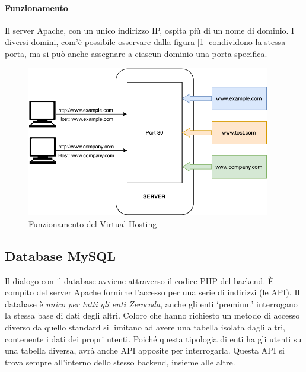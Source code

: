 \paragraph{Funzionamento} Il server Apache, con un unico indirizzo IP, ospita più di un nome di dominio. I diversi domini, com'è  possibile osservare dalla figura [\ref{fig:virtualhosting}] condividono la stessa porta, ma si può anche assegnare a ciascun dominio una porta specifica.

\begin{figure}[H]
    \centering
    \includegraphics[width=0.95\textwidth]{images/02_4_virtual_hosting.pdf}
    \caption{Funzionamento del Virtual Hosting}
    \label{fig:virtualhosting}
\end{figure}

\subsection{Database MySQL}
Il dialogo con il database avviene attraverso il codice PHP del backend. È compito del server Apache fornirne l'accesso per una serie di indirizzi (le API). Il database è \textit{unico per tutti gli enti Zerocoda}, anche gli enti `premium' interrogano la stessa base di dati degli altri. Coloro che hanno richiesto un metodo di accesso diverso da quello standard si limitano ad avere una tabella isolata dagli altri, contenente i dati dei propri utenti. Poiché questa tipologia di enti ha gli utenti su una tabella diversa, avrà anche API apposite per interrogarla. Questa API si trova sempre all'interno dello stesso backend, insieme alle altre.

